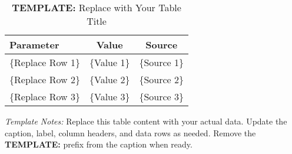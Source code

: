 \documentclass[\PathToRoot/\ProjectName]{subfiles}
\begin{document}

\begin{table}[h]
  \centering
  \caption{{\bf TEMPLATE:} Replace with Your Table Title\whenintegrated{\label{tab:template}}}
  \begin{tabular}{lcc}
    \hline
    \textbf{Parameter} & \textbf{Value} & \textbf{Source} \\
    \hline
    \{Replace Row 1\}  & \{Value 1\}    & \{Source 1\}    \\
    \{Replace Row 2\}  & \{Value 2\}    & \{Source 2\}    \\
    \{Replace Row 3\}  & \{Value 3\}    & \{Source 3\}    \\
    \hline
  \end{tabular}
  \begin{flushleft}
    \footnotesize
    \textit{Template Notes:} Replace this table content with your actual data.
    Update the caption, label, column headers, and data rows as needed.
    Remove the {\bf TEMPLATE:} prefix from the caption when ready.
  \end{flushleft}
\end{table}

\smartbib
\end{document}
